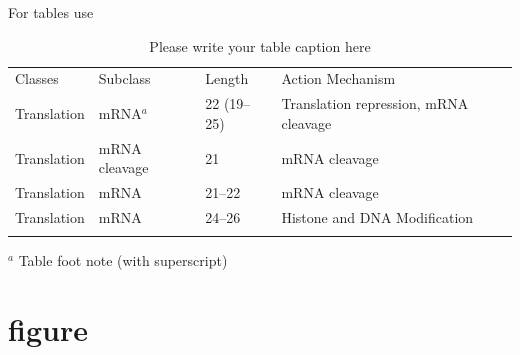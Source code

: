 For tables use
\begin{table}
	\caption{Please write your table caption here}
	\label{tab:1}       %
	\begin{tabular}{p{2cm}p{2.4cm}p{2cm}p{4.9cm}}
		\hline\noalign{\smallskip}
		Classes & Subclass & Length & Action Mechanism  \\
		\noalign{\smallskip}\svhline\noalign{\smallskip}
		Translation & mRNA$^a$  & 22 (19--25) & Translation repression, mRNA cleavage\\
		Translation & mRNA cleavage & 21 & mRNA cleavage\\
		Translation & mRNA  & 21--22 & mRNA cleavage\\
		Translation & mRNA  & 24--26 & Histone and DNA Modification\\
		\noalign{\smallskip}\hline\noalign{\smallskip}
	\end{tabular}
	$^a$ Table foot note (with superscript)
\end{table}

\section{figure}

